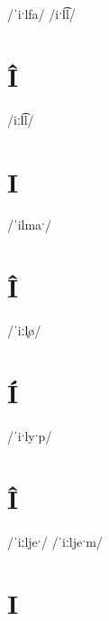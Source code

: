 \documentclass[10pt,a4paper,twoside]{book}
\begin{document}
\begin{multicols}{3}
 {/ˈiˑlfa/} {}
 {/iˑl͡l/} {}
\end{multicols}

\section*{Î}

\begin{multicols}{3}
 {/iːl͡l/} {}
\end{multicols}

\section*{I}

\begin{multicols}{3}
 {/ˈilmaˑ/} {}
\end{multicols}

\section*{Î}

\begin{multicols}{3}
 {/ˈiːl̥ø/} {}
\end{multicols}

\section*{Í}

\begin{multicols}{3}
 {/ˈiˑlyˑp/} {}
\end{multicols}

\section*{Î}

\begin{multicols}{3}
 {/ˈiːljeˑ/} {}
 {/ˈiːljeˑm/} {}
\end{multicols}

\section*{I}
\end{document}
